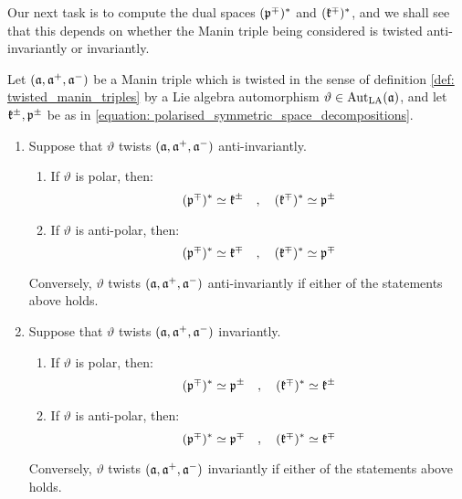        Our next task is to compute the dual spaces $(\mathfrak{p}^{\mp})^*$ and $(\mathfrak{k}^{\mp})^*$, and we shall see that this depends on whether the Manin triple being considered is twisted anti-invariantly or invariantly.
        \begin{lemma} \label{lemma: manin_triple_twists_and_duality}
            Let $(\mathfrak{a}, \mathfrak{a}^+, \mathfrak{a}^-)$ be a Manin triple which is twisted in the sense of definition \ref{def: twisted_manin_triples} by a Lie algebra automorphism $\vartheta \in \operatorname{Aut}_{\mathrm{LA}}(\mathfrak{a})$, and let $\mathfrak{k}^{\pm}, \mathfrak{p}^{\pm}$ be as in \eqref{equation: polarised_symmetric_space_decompositions}.
            \begin{enumerate}
                \item Suppose that $\vartheta$ twists $(\mathfrak{a}, \mathfrak{a}^+, \mathfrak{a}^-)$ anti-invariantly.
                \begin{enumerate}
                    \item If $\vartheta$ is polar, then:
                        \begin{equation} \label{equation: anti_invariant_twist_polar_duality}
                            (\mathfrak{p}^{\mp})^* \simeq \mathfrak{k}^{\pm} \quad, \quad (\mathfrak{k}^{\mp})^* \simeq \mathfrak{p}^{\pm}
                        \end{equation}
                    \item If $\vartheta$ is anti-polar, then:
                        \begin{equation} \label{equation: anti_invariant_twist_anti_polar_duality}
                            (\mathfrak{p}^{\mp})^* \simeq \mathfrak{k}^{\mp} \quad, \quad (\mathfrak{k}^{\mp})^* \simeq \mathfrak{p}^{\mp}
                        \end{equation}
                \end{enumerate}
                Conversely, $\vartheta$ twists $(\mathfrak{a}, \mathfrak{a}^+, \mathfrak{a}^-)$ anti-invariantly if either of the statements above holds.
                \item Suppose that $\vartheta$ twists $(\mathfrak{a}, \mathfrak{a}^+, \mathfrak{a}^-)$ invariantly.
                \begin{enumerate}
                    \item If $\vartheta$ is polar, then:
                        \begin{equation} \label{equation: invariant_twist_polar_duality}
                            (\mathfrak{p}^{\mp})^* \simeq \mathfrak{p}^{\pm} \quad, \quad (\mathfrak{k}^{\mp})^* \simeq \mathfrak{k}^{\pm}
                        \end{equation}
                    \item If $\vartheta$ is anti-polar, then:
                        \begin{equation} \label{equation: invariant_twist_anti_polar_duality}
                            (\mathfrak{p}^{\mp})^* \simeq \mathfrak{p}^{\mp} \quad, \quad (\mathfrak{k}^{\mp})^* \simeq \mathfrak{k}^{\mp}
                        \end{equation}
                \end{enumerate}
                Conversely, $\vartheta$ twists $(\mathfrak{a}, \mathfrak{a}^+, \mathfrak{a}^-)$ invariantly if either of the statements above holds.
            \end{enumerate}
        \end{lemma}
